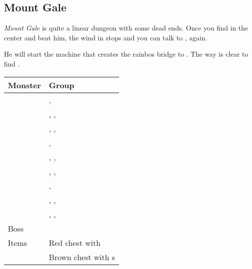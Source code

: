 \subsection{Mount Gale}
\label{map:mount_gale}

\textit{Mount Gale} is quite a linear dungeon with some dead ends. Once you find  in the center and beat him, the wind in  stops and you can talk to , again.

He will start the machine that creates the rainbos bridge to . The way is clear to find .


\noindent\begin{tabularx}{\textwidth}[l]{lX}
	Monster & Group
\\ \hline
	\nameref{monster:water_hag}
	& \nameref{monster:water_hag}, \nameref{monster:water_hag} \\
	& \nameref{monster:water_hag}, \nameref{monster:water_hag}, \nameref{monster:vampire} \\
	& \nameref{monster:water_hag}, \nameref{monster:water_hag}, \nameref{monster:water_hag}
\\ \hline
	\nameref{monster:skuldier}
	& \nameref{monster:skuldier}, \nameref{monster:skuldier} \\
	& \nameref{monster:skuldier}, \nameref{monster:skuldier}, \nameref{monster:water_hag} \\
	& \nameref{monster:skuldier}, \nameref{monster:skuldier}, \nameref{monster:skuldier}
\\ \hline
	\nameref{monster:vampire}
	& \nameref{monster:vampire}, \nameref{monster:vampire} \\
	& \nameref{monster:vampire}, \nameref{monster:vampire}, \nameref{monster:water_hag} \\
	& \nameref{monster:vampire}, \nameref{monster:vampire}, \nameref{monster:vampire}
\\ \hline
	Boss & \nameref{monster:dullahan}
\\ \hline
	Items
	& Red chest with \nameref{armor:apollo_helm} \\
	& Brown chest with \nameref{item:heal_potion}s
\end{tabularx}
